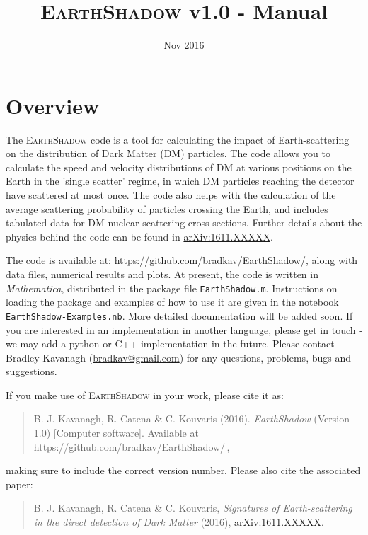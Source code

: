 \documentclass[notitlepage,12pt]{article}
\newcommand{\EarthShadow}{\textsc{EarthShadow}\xspace}
\newcommand{\ourpaper}{\href{http://arxiv.org/abs/1611.XXXXX}{arXiv:1611.XXXXX}\xspace}
\begin{document}
\title{\EarthShadow v1.0 - Manual \\ \vspace{0.5cm}\normalsize}

\date{\vspace{-1cm} Nov 2016}

\maketitle


\section{Overview}

The \EarthShadow code is a tool for calculating the impact of Earth-scattering on the distribution of Dark Matter (DM) particles. The code allows you to calculate the speed and velocity distributions of DM at various positions on the Earth in the 'single scatter' regime, in which DM particles reaching the detector have scattered at most once. The code also helps with the calculation of the average scattering probability of particles crossing the Earth, and includes tabulated data for DM-nuclear scattering cross sections. Further details about the physics behind the code can be found in \ourpaper.

The code is available at: \href{https://github.com/bradkav/EarthShadow/}{https://github.com/bradkav/EarthShadow/}, along with data files, numerical results and plots. At present, the code is written in \textit{Mathematica}, distributed in the package file \texttt{EarthShadow.m}. Instructions on loading the package and examples of how to use it are given in the notebook \texttt{EarthShadow-Examples.nb}. More detailed documentation will be added soon. If you are interested in an implementation in another language, please get in touch - we may add a python or C++ implementation in the future. Please contact Bradley Kavanagh (\href{mailto:bradkav@gmail.com?subject=EarthShadow v1.0}{bradkav@gmail.com}) for any questions, problems, bugs and suggestions.

If you make use of \EarthShadow in your work, please cite it as:

\begin{quote}
B. J. Kavanagh, R. Catena \& C. Kouvaris (2016). \textit{EarthShadow} (Version 1.0) [Computer software]. Available at https://github.com/bradkav/EarthShadow/\,,
\end{quote}
making sure to include the correct version number. Please also cite the associated paper:

\begin{quote}

B. J. Kavanagh, R. Catena \& C. Kouvaris, \textit{Signatures of Earth-scattering in the direct detection of Dark Matter} (2016), \ourpaper.
\end{quote}
\end{document}
